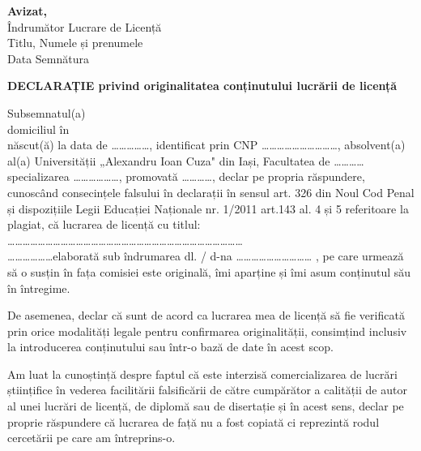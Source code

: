 \documentclass[12pt,a4paper]{report}
\begin{document}
\newpage
\begin{flushright}
\textbf{Avizat,}\\
Îndrumător Lucrare de Licență\\
Titlu, Numele și prenumele \makebox[6cm]{\dotfill}\\
Data \makebox[2cm]{\dotfill} Semnătura \makebox[3cm]{\dotfill}\\
\end{flushright}

\vspace{2cm}

\textbf{DECLARAȚIE privind originalitatea conținutului lucrării de licență}

\vspace{1cm}

Subsemnatul(a) \dotfill\\
domiciliul \dotfill în \dotfill\\
\dotfill născut(ă) la data de \ldots\ldots\ldots\ldots\ldots, identificat prin CNP \ldots\ldots\ldots\ldots\ldots\ldots\ldots\ldots\ldots\ldots, absolvent(a) al(a) Universității „Alexandru Ioan Cuza" din Iași, Facultatea de \ldots\ldots\ldots\ldots specializarea \ldots\ldots\ldots\ldots\ldots\ldots, promovată \ldots\ldots\ldots\ldots, declar pe propria răspundere, cunoscând consecințele falsului în declarații în sensul art. 326 din Noul Cod Penal și dispozițiile Legii Educației Naționale nr. 1/2011 art.143 al. 4 și 5 referitoare la plagiat, că lucrarea de licență cu titlul:\\
\ldots\ldots\ldots\ldots\ldots\ldots\ldots\ldots\ldots\ldots\ldots\ldots\ldots\ldots\ldots\ldots\ldots\ldots\ldots\ldots\ldots\ldots\ldots\ldots\ldots\ldots\ldots\ldots\ldots\ldots\ldots
\\
\ldots\ldots\ldots\ldots\ldots\ldots elaborată sub îndrumarea dl. / d-na \ldots\ldots\ldots\ldots\ldots\ldots\ldots\ldots\ldots\ldots
, pe care urmează să o susțin în fața comisiei este originală, îmi aparține și îmi asum conținutul său în întregime.

De asemenea, declar că sunt de acord ca lucrarea mea de licență să fie verificată prin orice modalități legale pentru confirmarea originalității, consimțind inclusiv la introducerea conținutului sau într-o bază de date în acest scop.

Am luat la cunoștință despre faptul că este interzisă comercializarea de lucrări științifice în vederea facilitării falsificării de către cumpărător a calității de autor al unei lucrări de licență, de diplomă sau de disertație și în acest sens, declar pe proprie răspundere că lucrarea de față nu a fost copiată ci reprezintă rodul cercetării pe care am întreprins-o.\vspace{1cm}
\end{document}
